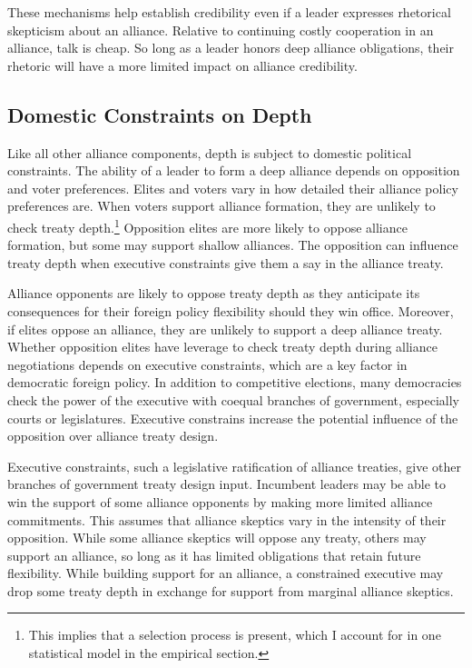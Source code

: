 \documentclass[12pt]{article}
\begin{document}


These mechanisms help establish credibility even if a leader expresses rhetorical skepticism about an alliance. 
Relative to continuing costly cooperation in an alliance, talk is cheap. 
So long as a leader honors deep alliance obligations, their rhetoric will have a more limited impact on alliance credibility. 




\subsection{Domestic Constraints on Depth} 

Like all other alliance components, depth is subject to domestic political constraints. 
The ability of a leader to form a deep alliance depends on opposition and voter preferences.
Elites and voters vary in how detailed their alliance policy preferences are. 
When voters support alliance formation, they are unlikely to check treaty depth.\footnote{This implies that a selection process is present, which I account for in one statistical model in the empirical section.} 
Opposition elites  are more likely to oppose alliance formation, but some may support shallow alliances. 
The opposition can influence treaty depth when executive constraints give them a say in the alliance treaty. 


Alliance opponents are likely to oppose treaty depth as they anticipate its consequences for their foreign policy flexibility should they win office.
Moreover, if elites oppose an alliance, they are unlikely to support a deep alliance treaty.  
Whether opposition elites have leverage to check treaty depth during alliance negotiations depends on executive constraints, which are a key factor in democratic foreign policy. 
In addition to competitive elections, many democracies check the power of the executive with coequal branches of government, especially courts or legislatures. 
Executive constrains increase the potential influence of the opposition over alliance treaty design.  

Executive constraints, such a legislative ratification of alliance treaties, give other branches of government treaty design input.
Incumbent leaders may be able to win the support of some alliance opponents by making more limited alliance commitments.
This assumes that alliance skeptics vary in the intensity of their opposition.  
While some alliance skeptics will oppose any treaty, others may support an alliance, so long as it has limited obligations that retain future flexibility. 
While building support for an alliance, a constrained executive may drop some treaty depth in exchange for support from marginal alliance skeptics. 
\end{document}
